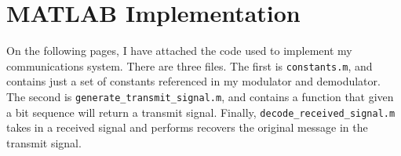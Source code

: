 \documentclass[11pt]{scrartcl}
\begin{document}
\section*{MATLAB Implementation}

On the following pages, I have attached the code used to implement my
communications system. There are three files. The first is \verb|constants.m|,
and contains just a set of constants referenced in my modulator and demodulator.
The second is \verb|generate_transmit_signal.m|, and contains a function that
given a bit sequence will return a transmit signal. Finally,
\verb|decode_received_signal.m| takes in a received signal and performs recovers
the original message in the transmit signal.

\pagebreak


\pagebreak


\pagebreak

\end{document}
